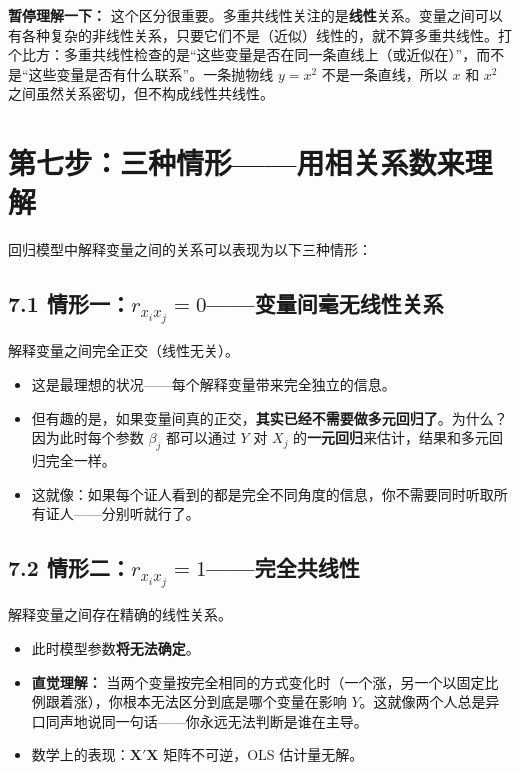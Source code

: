 \documentclass[12pt,a4paper]{ctexart}
\begin{document}
\textbf{暂停理解一下：} 这个区分很重要。多重共线性关注的是\textbf{线性}关系。变量之间可以有各种复杂的非线性关系，只要它们不是（近似）线性的，就不算多重共线性。打个比方：多重共线性检查的是“这些变量是否在同一条直线上（或近似在）”，而不是“这些变量是否有什么联系”。一条抛物线 $y = x^2$ 不是一条直线，所以 $x$ 和 $x^2$ 之间虽然关系密切，但不构成线性共线性。

\section*{第七步：三种情形——用相关系数来理解}

回归模型中解释变量之间的关系可以表现为以下三种情形：

\subsection*{7.1 情形一：$r_{x_i x_j} = 0$——变量间毫无线性关系}

解释变量之间完全正交（线性无关）。

\begin{itemize}
    \item 这是最理想的状况——每个解释变量带来完全独立的信息。
    \item 但有趣的是，如果变量间真的正交，\textbf{其实已经不需要做多元回归了}。为什么？因为此时每个参数 $\beta_j$ 都可以通过 $Y$ 对 $X_j$ 的\textbf{一元回归}来估计，结果和多元回归完全一样。
    \item 这就像：如果每个证人看到的都是完全不同角度的信息，你不需要同时听取所有证人——分别听就行了。
\end{itemize}

\subsection*{7.2 情形二：$r_{x_i x_j} = 1$——完全共线性}

解释变量之间存在精确的线性关系。

\begin{itemize}
    \item 此时模型参数\textbf{将无法确定}。
    \item \textbf{直觉理解：} 当两个变量按完全相同的方式变化时（一个涨，另一个以固定比例跟着涨），你根本无法区分到底是哪个变量在影响 $Y$。这就像两个人总是异口同声地说同一句话——你永远无法判断是谁在主导。
    \item 数学上的表现：$\boldsymbol{X}'\boldsymbol{X}$ 矩阵不可逆，OLS 估计量无解。
\end{itemize}
\end{document}
